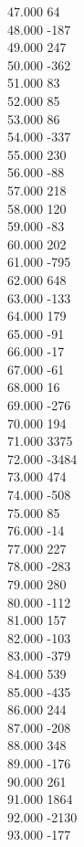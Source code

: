 { 47.000	64 \\
 48.000	-187 \\
 49.000	247 \\
 50.000	-362 \\
 51.000	83 \\
 52.000	85 \\
 53.000	86 \\
 54.000	-337 \\
 55.000	230 \\
 56.000	-88 \\
 57.000	218 \\
 58.000	120 \\
 59.000	-83 \\
 60.000	202 \\
 61.000	-795 \\
 62.000	648 \\
 63.000	-133 \\
 64.000	179 \\
 65.000	-91 \\
 66.000	-17 \\
 67.000	-61 \\
 68.000	16 \\
 69.000	-276 \\
 70.000	194 \\
 71.000	3375 \\
 72.000	-3484 \\
 73.000	474 \\
 74.000	-508 \\
 75.000	85 \\
 76.000	-14 \\
 77.000	227 \\
 78.000	-283 \\
 79.000	280 \\
 80.000	-112 \\
 81.000	157 \\
 82.000	-103 \\
 83.000	-379 \\
 84.000	539 \\
 85.000	-435 \\
 86.000	244 \\
 87.000	-208 \\
 88.000	348 \\
 89.000	-176 \\
 90.000	261 \\
 91.000	1864 \\
 92.000	-2130 \\
 93.000	-177 \\
}
